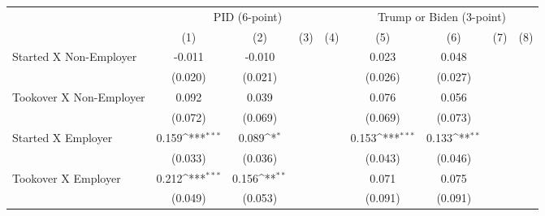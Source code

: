 {
\def\sym#1{\ifmmode^{#1}\else\(^{#1}\)\fi}
\begin{tabular}{l*{8}{c}}
\hline\hline
                    &\multicolumn{4}{c}{PID (6-point)}                                                      &\multicolumn{4}{c}{Trump or Biden (3-point)}                                           \\
                    &\multicolumn{1}{c}{(1)}         &\multicolumn{1}{c}{(2)}         &\multicolumn{1}{c}{(3)}         &\multicolumn{1}{c}{(4)}         &\multicolumn{1}{c}{(5)}         &\multicolumn{1}{c}{(6)}         &\multicolumn{1}{c}{(7)}         &\multicolumn{1}{c}{(8)}         \\
\hline
Started X Non-Employer&      -0.011         &      -0.010         &                     &                     &       0.023         &       0.048         &                     &                     \\
                    &     (0.020)         &     (0.021)         &                     &                     &     (0.026)         &     (0.027)         &                     &                     \\
Tookover X Non-Employer&       0.092         &       0.039         &                     &                     &       0.076         &       0.056         &                     &                     \\
                    &     (0.072)         &     (0.069)         &                     &                     &     (0.069)         &     (0.073)         &                     &                     \\
Started X Employer  &       0.159\sym{***}&       0.089\sym{*}  &                     &                     &       0.153\sym{***}&       0.133\sym{**} &                     &                     \\
                    &     (0.033)         &     (0.036)         &                     &                     &     (0.043)         &     (0.046)         &                     &                     \\
Tookover X Employer &       0.212\sym{***}&       0.156\sym{**} &                     &                     &       0.071         &       0.075         &                     &                     \\
                    &     (0.049)         &     (0.053)         &                     &                     &     (0.091)         &     (0.091)         &                     &                     \\

\end{tabular}}

